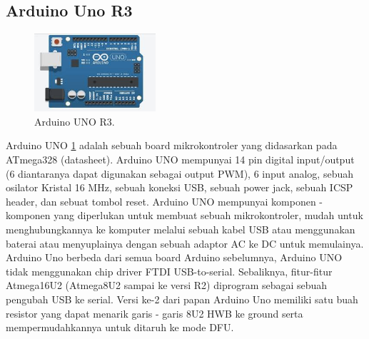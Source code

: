 \subsection{Arduino Uno R3}
\begin{figure}[ht]
\centerline{\includegraphics[width=0.4\textwidth]{figures/arduinounor3.jpg}}
\caption{Arduino UNO R3.}
\label{arduinounor3}
\end{figure}
Arduino UNO \ref{arduinounor3} adalah sebuah board mikrokontroler yang didasarkan pada ATmega328 (datasheet). Arduino UNO mempunyai 14 pin digital input/output (6 diantaranya dapat digunakan sebagai output PWM), 6 input analog, sebuah osilator Kristal 16 MHz, sebuah koneksi USB, sebuah power jack, sebuah ICSP header, dan sebuat tombol reset. Arduino UNO mempunyai komponen - komponen yang diperlukan untuk membuat sebuah mikrokontroler, mudah untuk menghubungkannya ke komputer melalui sebuah kabel USB atau menggunakan baterai atau menyuplainya dengan sebuah adaptor AC ke DC untuk memulainya.
Arduino Uno berbeda dari semua board Arduino sebelumnya, Arduino UNO tidak menggunakan chip driver FTDI USB-to-serial. Sebaliknya, fitur-fitur Atmega16U2 (Atmega8U2 sampai ke versi R2) diprogram sebagai sebuah pengubah USB ke serial. Versi ke-2 dari papan Arduino Uno memiliki satu buah resistor yang dapat menarik garis - garis 8U2 HWB ke ground serta mempermudahkannya untuk ditaruh ke mode DFU.
